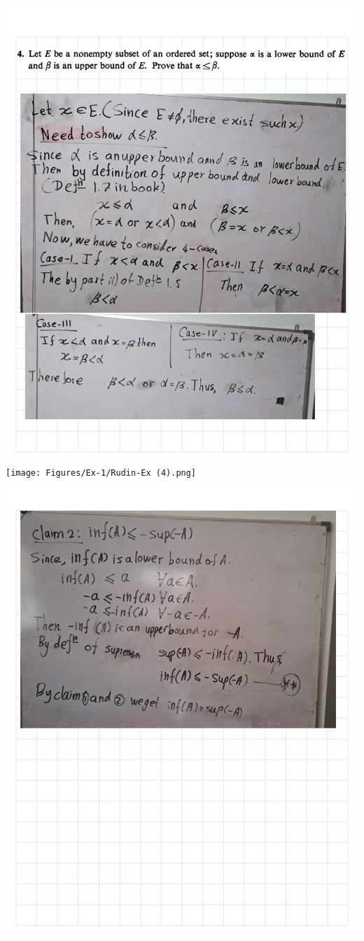 \documentclass[
]{book}
\theoremstyle{definition}
\theoremstyle{definition}
\theoremstyle{definition}
\theoremstyle{definition}
\theoremstyle{remark}
\begin{document}
\includegraphics{Figures/Ex-1/Rudin-Ex (3).png}
\texttt{[image: Figures/Ex-1/Rudin-Ex (4).png]}
\includegraphics{Figures/Ex-1/Rudin-Ex (5).png}
\end{document}
